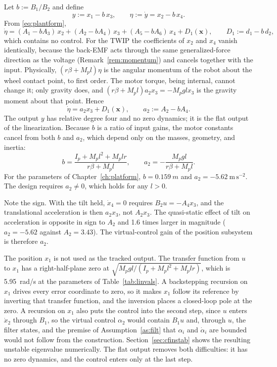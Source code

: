 Let $b:=B_1/B_2$ and define
\begin{equation}\label{eq:flatcoords}
y:=x_1-b\,x_3,\qquad \eta:=\dot y=x_2-b\,x_4 .
\end{equation}
From \eqref{eq:plantform},
\begin{equation}\label{eq:etadot}
\dot\eta=(A_1-bA_3)\,x_2+(A_2-bA_4)\,x_3+(A_5-bA_6)\,x_4+D_1(\mathbf{x}),
\qquad D_1:=d_1-b\,d_2 ,
\end{equation}
which contains no control. For the TWIP the coefficients of $x_2$ and $x_4$
vanish identically, because the back-EMF acts through the same
generalized-force direction as the voltage (Remark~\ref{rem:momentum}) and
cancels together with the input. Physically, $(r\beta+M_pl)\eta$ is the angular
momentum of the robot about the wheel contact point, to first order. The motor
torque, being internal, cannot change it; only gravity does, and
$(r\beta+M_pl)a_2x_3=-M_pglx_3$ is the gravity moment about that point. Hence
\begin{equation}\label{eq:etadot2}
\dot\eta=a_2x_3+D_1(\mathbf{x}),\qquad a_2:=A_2-bA_4 .
\end{equation}
The output $y$ has relative degree four and no zero dynamics; it is the flat
output of the linearization. Because $b$ is a ratio of input gains, the motor
constants cancel from both $b$ and $a_2$, which depend only on the masses,
geometry, and inertia:
\begin{equation}\label{eq:ba2}
b=\frac{I_p+M_pl^2+M_plr}{r\beta+M_pl},
\qquad
a_2=-\frac{M_pgl}{r\beta+M_pl}.
\end{equation}
For the parameters of Chapter~\ref{ch:platform}, $b=\SI{0.159}{m}$ and
$a_2=-5.62~\mathrm{m\,s^{-2}}$. The design requires $a_2\neq0$, which holds for
any $l>0$.

Note the sign. With the tilt held, $\dot x_4=0$ requires $B_2u=-A_4x_3$, and the
translational acceleration is then $a_2x_3$, not $A_2x_3$. The quasi-static
effect of tilt on acceleration is opposite in sign to $A_2$ and 1.6 times
larger in magnitude ($a_2=-5.62$ against $A_2=3.43$). The virtual-control gain
of the position subsystem is therefore $a_2$.

\begin{remark}\label{rem:output}
The position $x_1$ is not used as the tracked output. The transfer function from
$u$ to $x_1$ has a right-half-plane zero at $\sqrt{M_pgl/(I_p+M_pl^2+M_plr)}$,
which is \SI{5.95}{rad/s} at the parameters of Table~\ref{tab:linvals}. A
backstepping recursion on $x_1$ drives every error coordinate to zero, so it
makes $x_1$ follow its reference by inverting that transfer function, and the
inversion places a closed-loop pole at the zero. A recursion on $x_1$ also puts the control into the second step, since
$u$ enters $\dot x_2$ through $B_1$, so the virtual control $\alpha_2$ would
contain $B_1u$ and, through $u$, the filter states, and the premise of
Assumption~\ref{as:filt} that $\alpha_i$ and $\dot\alpha_i$ are bounded would
not follow from the construction. Section~\ref{sec:cfinstab} shows the
resulting unstable eigenvalue numerically. The flat output removes both
difficulties: it has no zero dynamics, and the control enters only at the last
step.
\end{remark}

